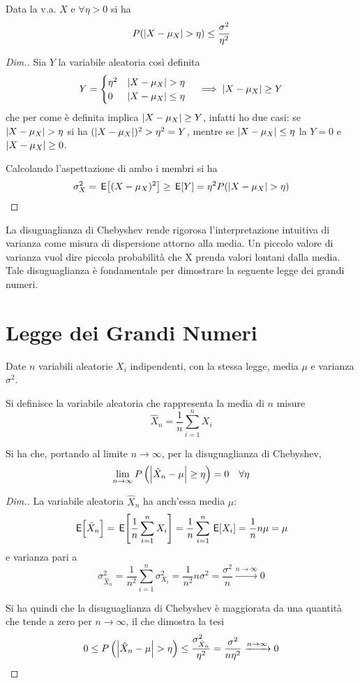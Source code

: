 Data la v.a. $X$ e $\forall\eta>0$ si ha
\begin{equation}
P(\abs{X-\mu_X}>\eta)\leq\frac{\sigma^2}{\eta^2}
\end{equation}
\begin{proof}[Dim.]
Sia $Y$ la variabile aleatoria così definita
\[Y=\begin{cases}\eta^2&\abs{X-\mu_X}>\eta\\0&\abs{X-\mu_X}\leq\eta\end{cases}\quad\implies\abs{X-\mu_X}\geq Y\]
che per come è definita implica $\left|{X-\mu_X}\right|\geq Y$, infatti ho due casi: se $\abs{X-\mu_X}>\eta$ si ha $(\left|{X-\mu_X}\right|)^2>\eta^2=Y$, mentre se $\left|{X-\mu_X}\right|\leq\eta$ la $Y=0$ e $\left|{X-\mu_X}\right|\geq 0$.

Calcolando l'aspettazione di ambo i membri si ha
\[\sigma^2_X=\E{(X-\mu_X)^2}\geq \E{Y}=\eta^2 P(\abs{X-\mu_X}>\eta)\]
\end{proof}

La disuguaglianza di Chebyshev rende rigorosa l'interpretazione intuitiva di varianza come misura di dispersione attorno alla media. Un piccolo valore di varianza vuol dire piccola probabilità che X prenda valori lontani dalla media.
Tale disuguaglianza è fondamentale per dimostrare la seguente legge dei grandi numeri.

\section{Legge dei Grandi Numeri}
Date $n$ variabili aleatorie $X_i$ indipendenti, con la stessa legge, media $\mu$ e varianza $\sigma^2$.

Si definisce la variabile aleatoria che rappresenta la media di $n$ misure
\[\hat{X}_n=\frac{1}{n}\sum_{i=1}^{n}X_i\]

Si ha che, portando al limite $n\to\infty$, per la disuguaglianza di Chebyshev,
\begin{equation}\label{eq:legge_grandi_numeri}
\lim\limits_{n\to\infty} P\left(\left|{\hat{X}_n-\mu}\right|\geq\eta\right)=0\quad\forall\eta
\end{equation}
\begin{proof}[Dim.]
La variabile aleatoria $\hat{X}_n$ ha anch'essa media $\mu$:
\[\,{\operatorname{\mathsf{E}}}\!\left[{\hat{X}_n}\right]=\,{\operatorname{\mathsf{E}}}\!\left[{\frac{1}{n}\sum_{i=1}^{n}X_i}\right]=\frac{1}{n}\sum_{i=1}^{n}\,{\operatorname{\mathsf{E}}}\!\left[{X_i}\right]=\frac{1}{n}n\mu=\mu\]
e varianza pari a
\[\sigma^2_{\hat{X}_n}=\frac{1}{n^2}\sum_{i=1}^{n}\sigma^2_{X_i}=\frac{1}{n^2}n\sigma^2=\frac{\sigma^2}{n}\xrightarrow{n\to\infty}0\]

Si ha quindi che la disuguaglianza di Chebyshev è maggiorata da una quantità che tende a zero per $n\to\infty$, il che dimostra la tesi
\[0\leq P\left(\abs{\hat{X}_n-\mu}>\eta\right)\leq \frac{\sigma^2_{\hat{X}_n}}{\eta^2}=\frac{\sigma^2}{n\eta^2} \xrightarrow{n\to\infty}0 \]
\end{proof}

